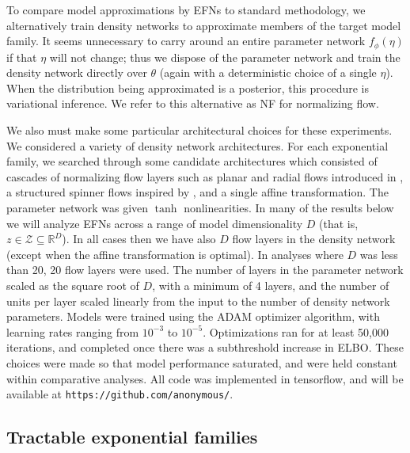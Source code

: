 \documentclass[twoside]{article}
\begin{document}
To compare model approximations by EFNs to standard methodology, we alternatively train density networks to approximate members of the target model family.  It seems unnecessary to carry around an entire parameter network $f_\phi(\eta)$ if that $\eta$ will not change; thus we dispose of the parameter network and train the density network directly over $\theta$ (again with a deterministic choice of a single $\eta$).  When the distribution being approximated is a posterior, this procedure is variational inference.  We refer to this alternative as NF for normalizing flow.


We also must make some particular architectural choices for these experiments.  
We considered a variety of density network architectures.  For each exponential family, we searched through some candidate architectures which consisted of cascades of normalizing flow layers such as planar and radial flows introduced in \citep{rezende2015variational}, a structured spinner flows inspired by \citep{ bojarski2016structured}, and a single affine transformation.
The parameter network was given $\tanh$ nonlinearities. 
In many of the results below we will analyze EFNs across a range of model dimensionality $D$ (that is, $z \in \mathcal{Z} \subseteq \mathbb{R}^D$).    In all cases then we have also $D$ flow layers in the density network (except when the affine transformation is optimal).  In analyses where $D$ was less than 20, 20 flow layers were used.  The number of layers in the parameter network scaled as the square root of $D$, with a minimum of 4 layers, and the number of units per layer scaled linearly from the input to the number of density network parameters. Models were trained using the ADAM optimizer algorithm, with learning rates ranging from $10^{-3}$ to $10^{-5}$.  Optimizations ran for at least 50,000 iterations, and completed once there was a subthreshold increase in ELBO. These choices were made so that model performance saturated, and were held constant within comparative analyses.
All code was implemented in tensorflow, and will be available at {\tt https://github.com/anonymous/}.







\subsection{Tractable exponential families}
\end{document}
